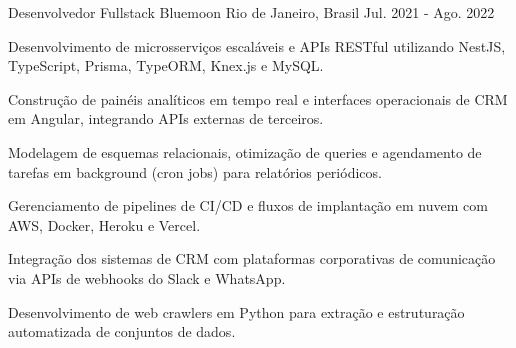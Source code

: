 \begin{cventries}
  \cventry
    {Desenvolvedor Fullstack} %
    {Bluemoon} %
    {Rio de Janeiro, Brasil} %
    {Jul. 2021 - Ago. 2022} %
    {
      \begin{cvitems} %
        \item {Desenvolvimento de microsserviços escaláveis e APIs RESTful utilizando NestJS, TypeScript, Prisma, TypeORM, Knex.js e MySQL.}
        \item {Construção de painéis analíticos em tempo real e interfaces operacionais de CRM em Angular, integrando APIs externas de terceiros.}
        \item {Modelagem de esquemas relacionais, otimização de queries e agendamento de tarefas em background (cron jobs) para relatórios periódicos.}
        \item {Gerenciamento de pipelines de CI/CD e fluxos de implantação em nuvem com AWS, Docker, Heroku e Vercel.}
        \item {Integração dos sistemas de CRM com plataformas corporativas de comunicação via APIs de webhooks do Slack e WhatsApp.}
        \item {Desenvolvimento de web crawlers em Python para extração e estruturação automatizada de conjuntos de dados.}
      \end{cvitems}
    }

\end{cventries}

\newpage


